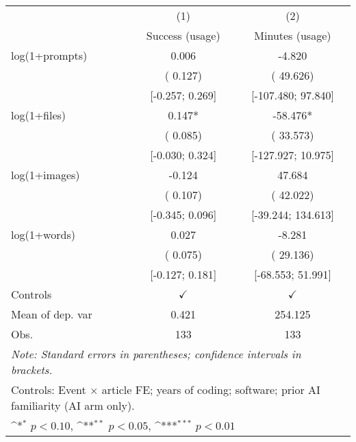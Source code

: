 \def\sym#1{\ifmmode^{#1}\else\(^{#1}\)\fi}
\begin{tabular}{l*{2}{c}}
\hline\hline
 & (1) & (2)
\\
 & Success (usage) & Minutes (usage)
 \\
\hline
log(1+prompts) &  0.006 & -4.820
\\
 & ( 0.127) & ( 49.626)
\\
 & [-0.257;  0.269] & [-107.480;  97.840]
\\
log(1+files) &  0.147* & -58.476*
\\
 & ( 0.085) & ( 33.573)
\\
 & [-0.030;  0.324] & [-127.927;  10.975]
\\
log(1+images) & -0.124 &  47.684
\\
 & ( 0.107) & ( 42.022)
\\
 & [-0.345;  0.096] & [-39.244;  134.613]
\\
log(1+words) &  0.027 & -8.281
\\
 & ( 0.075) & ( 29.136)
\\
 & [-0.127;  0.181] & [-68.553;  51.991]
\\
\hline
Controls & $\checkmark$ & $\checkmark$
\\
Mean of dep. var &  0.421 &  254.125
\\
Obs. & 133 & 133
\\
\hline
\hline\hline
\multicolumn{3}{l}{\it{Note:} Standard errors in parentheses; confidence intervals in brackets.}\\
\multicolumn{3}{l}{Controls: Event $\times$ article FE; years of coding; software; prior AI familiarity (AI arm only).}\\
\multicolumn{3}{l}{\sym{*} $p<0.10$, \sym{**} $p<0.05$,  \sym{***} $p<0.01$}\\
\end{tabular}
